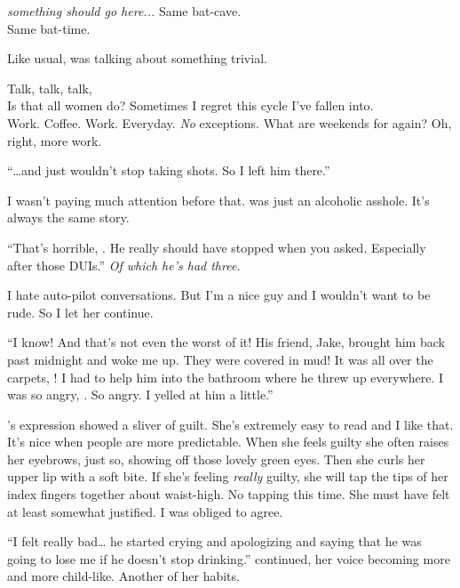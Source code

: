 \textit{something should go here...}
\lhoarb
\noindent
Same bat-cave. \\
Same bat-time.
\VV


\noindent
Like usual, \april{} was talking about something trivial.
\VV


\noindent
Talk, talk, talk,
\\
Is that all women do?
Sometimes I regret this cycle I've fallen into.
\\
Work.  Coffee.  Work. Everyday. \textit{No} exceptions.
What are weekends for again?  Oh, right, more work.
\VV


``\ldots{}and \eric{} just wouldn't stop taking shots.  So I left him there.''
\VV


\noindent
I wasn't paying much attention before that.
\eric{} was just an alcoholic asshole.  It's always the same story.
\VV


``That's horrible, \april.  He really should have stopped when you asked.
Especially after those DUIs.'' \textit{Of which he's had three.}
\VV


\noindent
I hate auto-pilot conversations.
But I'm a nice guy and I wouldn't want to be rude.
So I let her continue.
\VV


``I know! And that's not even the worst of it!
His friend, Jake, brought him back past midnight and woke me up.
They were covered in mud!  It was all over the carpets, \josh!
I had to help him into the bathroom where he threw up everywhere.
I was so angry, \josh.  So angry.  I yelled at him a little.''
\VV


\noindent
\april's expression showed a sliver of guilt.
She's extremely easy to read and I like that.
It's nice when people are more predictable.
When she feels guilty she often raises her eyebrows, just so, showing off
those lovely green eyes.  Then she curls her upper lip with a soft bite.
If she's feeling \textit{really} guilty, she will tap the tips of her
index fingers together about waist-high.
No tapping this time.  She must have felt at least somewhat justified.
I was obliged to agree.
\VV


``I felt really bad\ldots{} he started crying and apologizing and saying that he
was going to lose me if he doesn't stop drinking.''
\april{} continued, her voice becoming more and more child-like.
Another of her habits.
\VV



